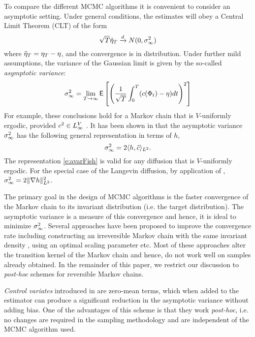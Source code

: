 To compare the different MCMC algorithms it  is convenient to consider an asymptotic setting.   Under general conditions, the estimates will obey a Central Limit Theorem (CLT) of the form
\begin{equation}
\sqrt{T} \tilde \eta_T \xrightarrow[]{d} N(0,\sigma_\infty^2)
\end{equation}
where $\tilde \eta_T =\eta_T-\eta$, and the convergence is in distribution.   Under further mild assumptions,  the variance of the Gaussian limit is given by the so-called \textit{asymptotic variance}:
\begin{equation}
\asymvar^2 = \lim_{T \to \infty} \Expect \left[\left(\frac{1}{\sqrt{T}}\int_{0}^{T}(c(\markovstate_t)-\eta)dt\right)^2\right]
\label{e:aVar}
\end{equation}
For example, these conclusions hold for a Markov chain that is $V$-uniformly ergodic,  provided $c^2\in L_\infty^V$  \cite{glymey96a,MT}.
It has been shown in \cite{glymey96a,MT} that the asymptotic variance $\sigma_\infty^2$ has the following general representation in terms of $h$,
\begin{equation}
\asymvar^2  =2\langle h, \tilc\rangle_{L^2}.
\label{e:avarFish}
\end{equation}
The representation \eqref{e:avarFish} is valid for any diffusion that is $V$-uniformly ergodic.
For the special case of the Langevin diffusion,  by application of , $\sigma_\infty^2 = 2 \| \nabla h \|^2_{L^2}$.

The primary goal in the design of MCMC algorithms is the faster convergence of the Markov chain to its invariant distribution (i.e. the target distribution). The asymptotic variance is a measure of this convergence and hence, it is ideal to minimize $\sigma_\infty^2$. Several approaches have been proposed to improve the convergence rate including constructing an irreversible Markov chain with the same invariant density \cite{hwanorwu15, dunlelpav16}, using an optimal scaling parameter \cite{robros01} etc. Most of these approaches alter the transition kernel of the Markov chain and hence, do not work well on samples already obtained. In the remainder of this paper, we restrict our discussion to \textit{post-hoc} schemes for reversible Markov chains.

\textit{Control variates} introduced in \cite{HenThesis,henmeytad03a,kimhen07,ctcn} are zero-mean terms, which when added to the estimator can produce a significant reduction in the asymptotic variance without adding bias. One of the advantages of this scheme is that they work \textit{post-hoc}, i.e. no changes are required in the sampling methodology and are independent of the MCMC algorithm used.

